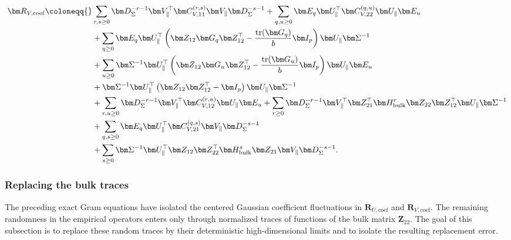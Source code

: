 \documentclass[11pt]{article}
\newcommand{\trans}{\top}
\DeclareMathOperator{\tr}{tr}
\begin{document}
\begin{align}
\label{eq:one-view-RV-coef}
  \bm R_{V,\mathrm{coef}}
  \coloneqq{}&
  \sum_{r,s\ge0}
    \bm D_\Sigma^{-r-1}
    \bm V_\parallel^\trans
    \bm C_{V,11}^{(r,s)}
    \bm V_\parallel
    \bm D_\Sigma^{-s-1}
  +
  \sum_{q,u\ge0}
    \bm E_q
    \bm U_\parallel^\trans
    \bm C_{V,22}^{(q,u)}
    \bm U_\parallel
    \bm E_u
  \notag\\
  &+
  \sum_{q\ge0}
  \bm E_q\bm U_\parallel^\trans
  \left(
    \bm Z_{12}\bm G_q\bm Z_{12}^\trans
    -
    \frac{\tr(\bm G_q)}{b}\bm I_p
  \right)
  \bm U_\parallel\bm\Sigma^{-1}
  \notag\\
  &+
  \sum_{u\ge0}
  \bm\Sigma^{-1}\bm U_\parallel^\trans
  \left(
    \bm Z_{12}\bm G_u\bm Z_{12}^\trans
    -
    \frac{\tr(\bm G_u)}{b}\bm I_p
  \right)
  \bm U_\parallel\bm E_u
  \notag\\
  &+
  \bm\Sigma^{-1}\bm U_\parallel^\trans
  \left(
    \bm Z_{12}\bm Z_{12}^\trans-\bm I_p
  \right)
  \bm U_\parallel\bm\Sigma^{-1}
  \notag\\
  &+
  \sum_{r,u\ge0}
    \bm D_\Sigma^{-r-1}
    \bm V_\parallel^\trans
    \bm C_{V,12}^{(r,u)}
    \bm U_\parallel
    \bm E_u
  +
  \sum_{r\ge0}
    \bm D_\Sigma^{-r-1}
    \bm V_\parallel^\trans
    \bm Z_{21}^\trans\bm H_{\rm bulk}^r
    \bm Z_{22}\bm Z_{12}^\trans
    \bm U_\parallel\bm\Sigma^{-1}
  \notag\\
  &+
  \sum_{q,s\ge0}
    \bm E_q
    \bm U_\parallel^\trans
    \bm C_{V,21}^{(q,s)}
    \bm V_\parallel
    \bm D_\Sigma^{-s-1}
  \notag\\
  &+
  \sum_{s\ge0}
    \bm\Sigma^{-1}\bm U_\parallel^\trans
    \bm Z_{12}\bm Z_{22}^\trans
    \bm H_{\rm bulk}^s\bm Z_{21}
    \bm V_\parallel\bm D_\Sigma^{-s-1}.
\end{align}


\subsubsection{Replacing the bulk traces}

The preceding exact Gram equations have isolated the centered Gaussian
coefficient fluctuations in
$\bm R_{U,\mathrm{coef}}$ and $\bm R_{V,\mathrm{coef}}$.
The remaining randomness in the empirical operators enters only through
normalized traces of functions of the bulk matrix $\bm Z_{22}$.  The goal of this
subsection is to replace these random traces by their deterministic high-dimensional limits and to isolate the resulting replacement error.
\end{document}
